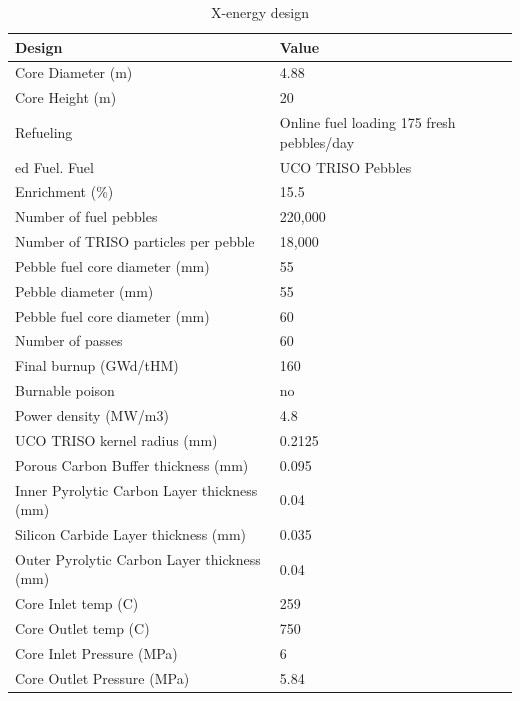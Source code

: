 \documentclass[10pt,a4paper]{article}
\begin{document}
\begin{table} [ht]
\begin{center}

\caption{ X-energy design}
\label{xtable}
\begin{tabular}{|l|l|}
\hline 
Design 		&Value \\ 
\hline 
Core Diameter (m) 		&4.88 \\ 
\hline 
Core Height (m) 		&20 \\ 
\hline 
Refueling		&Online fuel loading 
175 fresh pebbles/day \\ 
\hline ed Fuel.
Fuel		&UCO TRISO Pebbles \\ 
\hline 
Enrichment (\%)		&15.5 \\ 
\hline 
Number of fuel pebbles		&220,000 \\ 
\hline 
Number of TRISO particles per pebble		&18,000 \\ 
\hline 
Pebble fuel core diameter (mm)		&55 \\ 
\hline 
Pebble diameter (mm)	&55 \\ 
\hline 
Pebble fuel core diameter (mm)		&60 \\ 
\hline 
Number of passes		&60\\ 
\hline 
Final burnup (GWd/tHM)		&160 \\ 
\hline 
Burnable poison		&no \\ 
\hline 
Power density (MW/m3)		&4.8 \\ 
\hline 
UCO TRISO kernel radius (mm)	&0.2125 \\ 
\hline 
Porous Carbon Buffer thickness (mm)	&0.095 \\ 
\hline 
Inner Pyrolytic Carbon Layer thickness (mm) 	&0.04 \\ 
\hline 
Silicon Carbide Layer thickness (mm)	&0.035 \\ 
\hline 
Outer Pyrolytic Carbon Layer thickness (mm)	&0.04 \\ 
\hline 
Core Inlet temp (C)	&259 \\ 
\hline 
Core Outlet temp (C) 	&750 \\ 
\hline 
Core Inlet Pressure (MPa)	&6 \\ 
\hline 
Core Outlet Pressure (MPa)	&5.84 \\ 
\hline 

\end{tabular}
\end{center}
\end{table}
\end{document}
